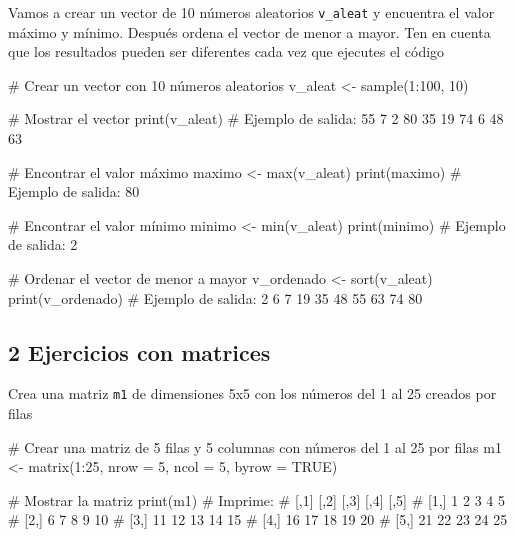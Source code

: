 \documentclass[
  letterpaper,
  DIV=11,
  numbers=noendperiod]{scrreprt}
\newenvironment{Shaded}{\begin{snugshade}}{\end{snugshade}}
\newcommand{\AttributeTok}[1]{\textcolor[rgb]{0.40,0.45,0.13}{#1}}
\newcommand{\CommentTok}[1]{\textcolor[rgb]{0.37,0.37,0.37}{#1}}
\newcommand{\ConstantTok}[1]{\textcolor[rgb]{0.56,0.35,0.01}{#1}}
\newcommand{\DecValTok}[1]{\textcolor[rgb]{0.68,0.00,0.00}{#1}}
\newcommand{\FunctionTok}[1]{\textcolor[rgb]{0.28,0.35,0.67}{#1}}
\newcommand{\NormalTok}[1]{\textcolor[rgb]{0.00,0.23,0.31}{#1}}
\newcommand{\OtherTok}[1]{\textcolor[rgb]{0.00,0.23,0.31}{#1}}
\newcommand{\SpecialCharTok}[1]{\textcolor[rgb]{0.37,0.37,0.37}{#1}}
\begin{document}
Vamos a crear un vector de 10 números aleatorios \texttt{v\_aleat} y
encuentra el valor máximo y mínimo. Después ordena el vector de menor a
mayor. Ten en cuenta que los resultados pueden ser diferentes cada vez
que ejecutes el código

\begin{Shaded}
\begin{Highlighting}[]
\CommentTok{\# Crear un vector con 10 números aleatorios}
\NormalTok{v\_aleat }\OtherTok{\textless{}{-}} \FunctionTok{sample}\NormalTok{(}\DecValTok{1}\SpecialCharTok{:}\DecValTok{100}\NormalTok{, }\DecValTok{10}\NormalTok{)}

\CommentTok{\# Mostrar el vector}
\FunctionTok{print}\NormalTok{(v\_aleat)}
\CommentTok{\# Ejemplo de salida: 55  7  2  80 35 19 74  6 48 63}

\CommentTok{\# Encontrar el valor máximo}
\NormalTok{maximo }\OtherTok{\textless{}{-}} \FunctionTok{max}\NormalTok{(v\_aleat)}
\FunctionTok{print}\NormalTok{(maximo)}
\CommentTok{\# Ejemplo de salida: 80}

\CommentTok{\# Encontrar el valor mínimo}
\NormalTok{minimo }\OtherTok{\textless{}{-}} \FunctionTok{min}\NormalTok{(v\_aleat)}
\FunctionTok{print}\NormalTok{(minimo)}
\CommentTok{\# Ejemplo de salida: 2}

\CommentTok{\# Ordenar el vector de menor a mayor}
\NormalTok{v\_ordenado }\OtherTok{\textless{}{-}} \FunctionTok{sort}\NormalTok{(v\_aleat)}
\FunctionTok{print}\NormalTok{(v\_ordenado)}
\CommentTok{\# Ejemplo de salida: 2  6  7 19 35 48 55 63 74 80}
\end{Highlighting}
\end{Shaded}

\hypertarget{ejercicios-con-matrices-1}{%
\subsection{2 Ejercicios con matrices}\label{ejercicios-con-matrices-1}}

Crea una matriz \texttt{m1} de dimensiones 5x5 con los números del 1 al
25 creados por filas

\begin{Shaded}
\begin{Highlighting}[]
\CommentTok{\# Crear una matriz de 5 filas y 5 columnas con números del 1 al 25 por filas}
\NormalTok{m1 }\OtherTok{\textless{}{-}} \FunctionTok{matrix}\NormalTok{(}\DecValTok{1}\SpecialCharTok{:}\DecValTok{25}\NormalTok{, }\AttributeTok{nrow =} \DecValTok{5}\NormalTok{, }\AttributeTok{ncol =} \DecValTok{5}\NormalTok{, }\AttributeTok{byrow =} \ConstantTok{TRUE}\NormalTok{)}

\CommentTok{\# Mostrar la matriz}
\FunctionTok{print}\NormalTok{(m1)}
\CommentTok{\# Imprime:}
\CommentTok{\#      [,1] [,2] [,3] [,4] [,5]}
\CommentTok{\# [1,]    1    2    3    4    5}
\CommentTok{\# [2,]    6    7    8    9   10}
\CommentTok{\# [3,]   11   12   13   14   15}
\CommentTok{\# [4,]   16   17   18   19   20}
\CommentTok{\# [5,]   21   22   23   24   25}
\end{Highlighting}
\end{Shaded}
\end{document}
